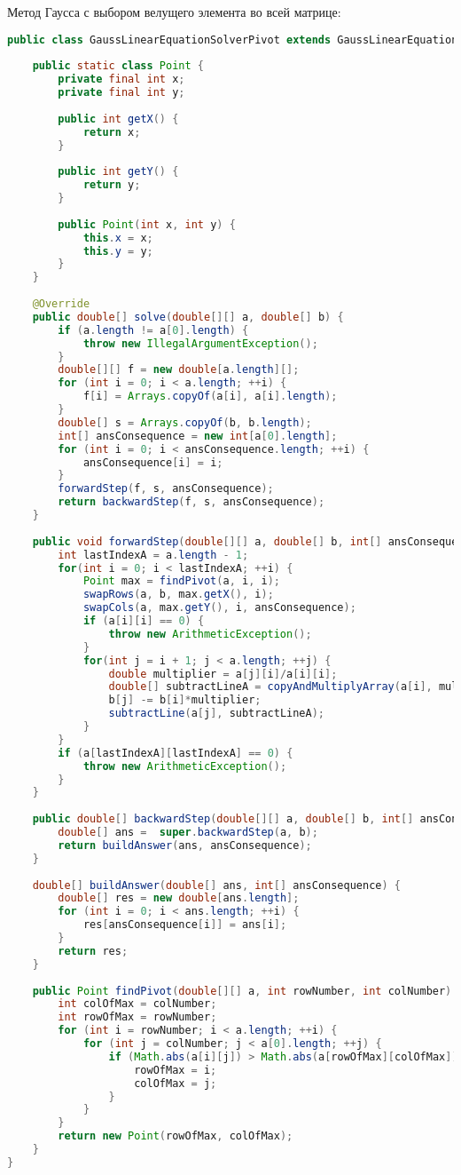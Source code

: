 \documentclass[14pt, a4paper]{extarticle}
\begin{document}
	Метод Гаусса с выбором велущего элемента во всей матрице:		
\begin{lstlisting}[language=java]
public class GaussLinearEquationSolverPivot extends GaussLinearEquationSolver {
	
	public static class Point {
		private final int x;
		private final int y;
		
		public int getX() {
			return x;
		}
		
		public int getY() {
			return y;
		}
		
		public Point(int x, int y) {
			this.x = x;
			this.y = y;
		}
	}
	
	@Override
	public double[] solve(double[][] a, double[] b) {
		if (a.length != a[0].length) {
			throw new IllegalArgumentException();
		}
		double[][] f = new double[a.length][];
		for (int i = 0; i < a.length; ++i) {
			f[i] = Arrays.copyOf(a[i], a[i].length);
		}
		double[] s = Arrays.copyOf(b, b.length);
		int[] ansConsequence = new int[a[0].length];
		for (int i = 0; i < ansConsequence.length; ++i) {
			ansConsequence[i] = i;
		}
		forwardStep(f, s, ansConsequence);
		return backwardStep(f, s, ansConsequence);
	}
	
	public void forwardStep(double[][] a, double[] b, int[] ansConsequence) {
		int lastIndexA = a.length - 1;
		for(int i = 0; i < lastIndexA; ++i) {
			Point max = findPivot(a, i, i);
			swapRows(a, b, max.getX(), i);
			swapCols(a, max.getY(), i, ansConsequence);
			if (a[i][i] == 0) {
				throw new ArithmeticException();
			}
			for(int j = i + 1; j < a.length; ++j) {
				double multiplier = a[j][i]/a[i][i];
				double[] subtractLineA = copyAndMultiplyArray(a[i], multiplier);
				b[j] -= b[i]*multiplier;
				subtractLine(a[j], subtractLineA);
			}
		}
		if (a[lastIndexA][lastIndexA] == 0) {
			throw new ArithmeticException();
		}
	}
	
	public double[] backwardStep(double[][] a, double[] b, int[] ansConsequence) {
		double[] ans =  super.backwardStep(a, b);
		return buildAnswer(ans, ansConsequence);
	}
	
	double[] buildAnswer(double[] ans, int[] ansConsequence) {
		double[] res = new double[ans.length];
		for (int i = 0; i < ans.length; ++i) {
			res[ansConsequence[i]] = ans[i];
		}
		return res;
	}
	
	public Point findPivot(double[][] a, int rowNumber, int colNumber) {
		int colOfMax = colNumber;
		int rowOfMax = rowNumber;
		for (int i = rowNumber; i < a.length; ++i) {
			for (int j = colNumber; j < a[0].length; ++j) {
				if (Math.abs(a[i][j]) > Math.abs(a[rowOfMax][colOfMax])) {
					rowOfMax = i;
					colOfMax = j;
				}
			}
		}
		return new Point(rowOfMax, colOfMax);
	}	
}
\end{lstlisting}
	
\end{document}
